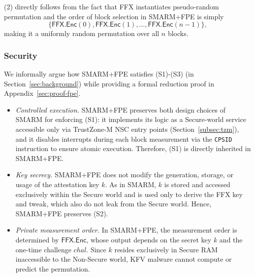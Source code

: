 \documentclass{ieeeaccess}
\newcommand{\rtsmarmtwo}{SMARM+FPE\xspace}
\begin{document}
(2) directly follows from the fact that FFX instantiates pseudo-random permutation and the order of block selection in \rtsmarmtwo is simply\[
  \{\mathsf{FFX.Enc}(0), \mathsf{FFX.Enc}(1), \ldots,
    \mathsf{FFX.Enc}(n-1)\},
\] making it a uniformly random permutation over all $n$ blocks.



\subsubsection{Security}
We informally argue how \rtsmarmtwo satisfies (S1)-(S3) (in Section~\ref{sec:background}) while providing a formal reduction proof in Appendix~\ref{sec:proof-fpe}.

\begin{itemize}
  \item[(S1)] \emph{Controlled execution.}
  \rtsmarmtwo preserves both design choices of SMARM for 
  enforcing (S1): it implements its logic as a Secure-world 
  service accessible only via TrustZone-M NSC entry points 
  (Section~\ref{subsec:tzm}), and it disables interrupts 
  during each block measurement via the \texttt{CPSID} 
  instruction to ensure atomic execution.
  Therefore, (S1) is directly inherited in \rtsmarmtwo.

  \item[(S2)] \emph{Key secrecy.}
  \rtsmarmtwo does not modify the generation, storage, or 
  usage of the attestation key $k$.
  As in SMARM, $k$ is stored and accessed exclusively within 
  the Secure world and is used only to derive the FFX key and tweak, which also do not leak from the Secure world.
  Hence, \rtsmarmtwo preserves (S2).

  \item[(S3)] \emph{Private measurement order.}
  In \rtsmarmtwo, the measurement order is determined by 
  $\mathsf{FFX.Enc}$, whose output depends on the 
  secret key $k$ and the one-time challenge $chal$.
  Since $k$ resides exclusively in Secure RAM inaccessible to the Non-Secure world, KFV malware cannot compute or predict the permutation.

\end{itemize}
\end{document}
